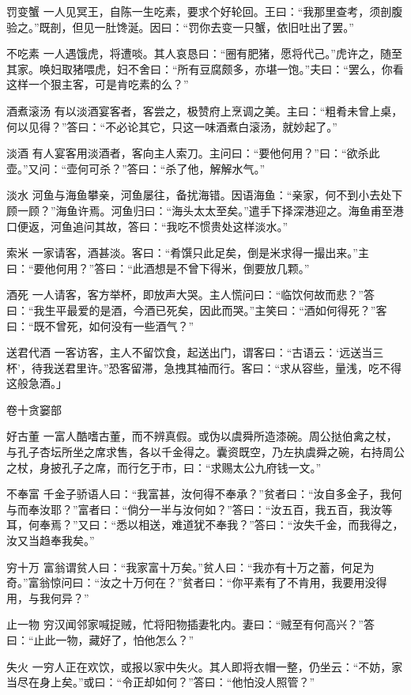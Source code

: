\documentclass[12pt,UTF8]{ctexbook}
\begin{document}
罚变蟹
一人见冥王，自陈一生吃素，要求个好轮回。王曰：“我那里查考，须剖腹验之。”既剖，但见一肚馋涎。因曰：“罚你去变一只蟹，依旧吐出了罢。”

不吃素
一人遇饿虎，将遭啖。其人哀恳曰：“圈有肥猪，愿将代己。”虎许之，随至其家。唤妇取猪喂虎，妇不舍曰：“所有豆腐颇多，亦堪一饱。”夫曰：“罢么，你看这样一个狠主客，可是肯吃素的么？”

酒煮滚汤
有以淡酒宴客者，客尝之，极赞府上烹调之美。主曰：“粗肴未曾上桌，何以见得？”答曰：“不必论其它，只这一味酒煮白滚汤，就妙起了。”

淡酒
有人宴客用淡酒者，客向主人索刀。主问曰：“要他何用？”曰：“欲杀此壶。”又问：“壶何可杀？”答曰：“杀了他，解解水气。”

淡水
河鱼与海鱼攀亲，河鱼屡往，备扰海错。因语海鱼：“亲家，何不到小去处下顾一顾？”海鱼许焉。河鱼归曰：“海头太太至矣。”遣手下择深港迎之。海鱼甫至港口便返，河鱼追问其故，答曰：“我吃不惯贵处这样淡水。”

索米
一家请客，酒甚淡。客曰：“肴馔只此足矣，倒是米求得一撮出来。”主曰：“要他何用？”答曰：“此酒想是不曾下得米，倒要放几颗。”

酒死
一人请客，客方举杯，即放声大哭。主人慌问曰：“临饮何故而悲？”答曰：“我生平最爱的是酒，今酒已死矣，因此而哭。”主笑曰：“酒如何得死？”客曰：“既不曾死，如何没有一些酒气？”

送君代酒
一客访客，主人不留饮食，起送出门，谓客曰：“古语云：‘远送当三杯’，待我送君里许。”恐客留滞，急拽其袖而行。客曰：“求从容些，量浅，吃不得这般急酒。」

卷十贪窭部

好古董
一富人酷嗜古董，而不辨真假。或伪以虞舜所造漆碗。周公挞伯禽之杖，与孔子杏坛所坐之席求售，各以千金得之。囊资既空，乃左执虞舜之碗，右持周公之杖，身披孔子之席，而行乞于市，曰：“求赐太公九府钱一文。”

不奉富
千金子骄语人曰：“我富甚，汝何得不奉承？”贫者曰：“汝自多金子，我何与而奉汝耶？”富者曰：“倘分一半与汝何如？”答曰：“汝五百，我五百，我汝等耳，何奉焉？”又曰：“悉以相送，难道犹不奉我？”答曰：“汝失千金，而我得之，汝又当趋奉我矣。”

穷十万
富翁谓贫人曰：“我家富十万矣。”贫人曰：“我亦有十万之蓄，何足为奇。”富翁惊问曰：“汝之十万何在？”贫者曰：“你平素有了不肯用，我要用没得用，与我何异？”

止一物
穷汉闻邻家喊捉贼，忙将阳物插妻牝内。妻曰：“贼至有何高兴？”答曰：“止此一物，藏好了，怕他怎么？”

失火
一穷人正在欢饮，或报以家中失火。其人即将衣帽一整，仍坐云：“不妨，家当尽在身上矣。”或曰：“令正却如何？”答曰：“他怕没人照管？”
\end{document}
